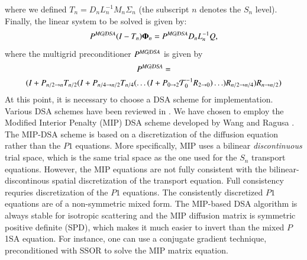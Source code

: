 \documentclass[preprint,10pt]{elsarticle}
\newcommand\bs{\boldsymbol}
\renewcommand{\(}{\left(}
\renewcommand{\)}{\right)}
\renewcommand{\[}{\left[}
\renewcommand{\]}{\right]}
\newcommand{\be}{\begin{equation}}
\newcommand{\ee}{\end{equation}}
\begin{document}
%
where we defined $T_n = D_n L_n^{-1}M_n \Sigma_n$ (the subscript $n$ denotes 
the $S_n$ level).\\
Finally, the linear system to be solved is given by:
%
\be
\label{anmg-dsa}
P^{\text{\it MG/DSA}} (I-T_n) \bs{\Phi}_n =  P^{\text{\it MG/DSA}} D_n L_n^{-1} Q ,
\ee
%
where the multigrid preconditioner $P^{\text{\it MG/DSA}}$ is given by
%
\begin{multline}
P^{\text{\it MG/DSA}} =
\\
(I+P_{{n}/{2}\rightarrow n }
T_{{n}/{2}} (I+P_{{n}/{4}\rightarrow {n}/{2}}T_{{n}/{4}} (\hdots
(I+P_{0\rightarrow 2} \mathcal{T}_0^{-1} R_{2\rightarrow 0})\hdots)
R_{{n}/{2}\rightarrow {n}/{4}})R_{n\rightarrow{n}/{2}})
\end{multline}
%
%
At this point, it is necessary to choose a DSA scheme for implementation. Various DSA
schemes have been reviewed in \cite{adams}. We have chosen to employ the 
Modified Interior Penalty (MIP) DSA scheme developed by Wang and Ragusa \cite{mip}. 
The MIP-DSA scheme is based on a discretization of the diffusion equation 
rather than the $P1$ equations.  More specifically, MIP uses a bilinear {\it discontinuous} 
trial space, which is the same trial space as the one used for the $S_n$ transport equations.  
However, the MIP equations are not fully consistent with the bilinear-discontinous spatial 
discretization of the transport equation.  Full consistency requries discretization of 
the $P1$ equations.  The consistently discretized $P1$ equations are of a 
non-symmetric mixed form.  The MIP-based DSA algorithm is always stable for isotropic scattering and the MIP 
diffusion matrix is symmetric positive definite (SPD), which makes it much easier to invert than the mixed 
$P$1SA equation.  For instance, one can use a conjugate gradient technique, preconditioned with SSOR to solve the MIP matrix equation.
\end{document}
